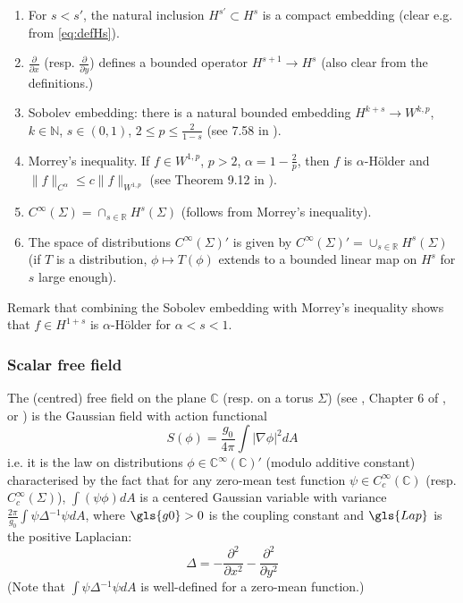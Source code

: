\documentclass[10pt]{article}
\newcommand{\R}{\mathbb{R}}
\newcommand{\N}{\mathbb{N}}
\newcommand{\C}{\mathbb{C}}
\newcommand{\Lap}{\Delta\!}
\begin{document}
\begin{enumerate}
\item For $s<s'$, the natural inclusion $H^{s'}\subset H^{s}$ is a compact embedding (clear e.g. from \eqref{eq:defHs}).
\item $\frac{\partial}{\partial x}$ (resp. $\frac{\partial}{\partial y}$) defines a bounded operator $H^{s+1}\rightarrow H^s$ (also clear from the definitions.)
\item Sobolev embedding: there is a natural bounded embedding $H^{k+s}\rightarrow W^{k,p}$, $k\in\N$, $s\in(0,1)$, $2\leq p\leq\frac 2{1-s}$ (see 7.58 in \cite{Adams_Sobolev}).
\item Morrey's inequality. If $f\in W^{1,p}$, $p>2$, $\alpha=1-\frac 2p$, then $f$ is $\alpha$-H\"older and $\|f\|_{C^\alpha}\leq c\|f\|_{W^{1,p}}$ (see Theorem 9.12 in \cite{Brezis}).
\item $C^\infty(\Sigma)=\cap_{s\in\R}H^s(\Sigma)$ (follows from Morrey's inequality).
\item The space of distributions $C^\infty(\Sigma)'$ is given by $C^\infty(\Sigma)'=\cup_{s\in\R}H^s(\Sigma)$ (if $T$ is a distribution, $\phi\mapsto T(\phi)$ extends to a bounded linear map on $H^s$ for $s$ large enough).
\end{enumerate}
Remark that combining the Sobolev embedding with Morrey's inequality shows that $f\in H^{1+s}$ is $\alpha$-H\"older for $\alpha<s<1$.




\subsubsection{Scalar free field}

The (centred) free field on the plane $\C$ (resp. on a torus $\Sigma$) (see \cite{Simon_Pphi}, Chapter 6 of \cite{Glimm_Jaffe}, or \cite{She_GFFmath}) is the Gaussian field with action functional
\begin{equation}\label{eq:GFFaction}
S(\phi)=\frac{g_0}{4\pi}\int|\nabla\phi|^2dA
\end{equation}
i.e. it is the law on distributions $\phi\in\C^\infty(\C)'$ (modulo additive constant) characterised by the fact that for any zero-mean test function $\psi\in C^\infty_c(\C)$ (resp. $C^\infty_c(\Sigma)$), $\int (\psi\phi) dA$ is a centered Gaussian variable with variance $\frac{2\pi}{g_0}\int \psi\Lap^{-1}\psi dA$, where $\gls{g0}>0$ is the coupling constant and $\gls{Lap}$ is the positive Laplacian:
$$\Lap=-\frac{\partial^2}{\partial x^2}-\frac{\partial^2}{\partial y^2}$$
(Note that $\int\psi\Lap^{-1}\psi dA$ is well-defined for a zero-mean function.)
\end{document}

